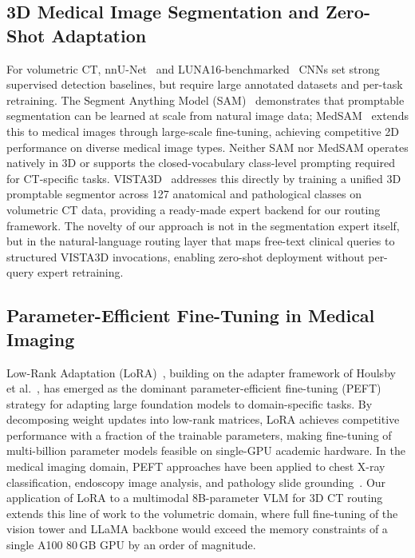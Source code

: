 \documentclass[lineno,referee,pdflatex,sn-mathphys-num]{sn-jnl}
\begin{document}
\subsection{3D Medical Image Segmentation and Zero-Shot Adaptation}

For volumetric CT, nnU-Net~\cite{nnunet2021} and
LUNA16-benchmarked~\cite{luna16} CNNs set strong supervised detection
baselines, but require large annotated datasets and per-task retraining.
The Segment Anything Model (SAM)~\cite{kirillov2023sam} demonstrates that
promptable segmentation can be learned at scale from natural image data;
MedSAM~\cite{ma2024medsam} extends this to medical images through
large-scale fine-tuning, achieving competitive 2D performance on diverse
medical image types. Neither SAM nor MedSAM operates natively in 3D or
supports the closed-vocabulary class-level prompting required for
CT-specific tasks. VISTA3D~\cite{vista3d2024} addresses this directly by
training a unified 3D promptable segmentor across 127 anatomical and
pathological classes on volumetric CT data, providing a ready-made expert
backend for our routing framework. The novelty of our approach is not in
the segmentation expert itself, but in the natural-language routing layer
that maps free-text clinical queries to structured VISTA3D invocations,
enabling zero-shot deployment without per-query expert retraining.

\subsection{Parameter-Efficient Fine-Tuning in Medical Imaging}

Low-Rank Adaptation (LoRA)~\cite{lora2022}, building on the adapter
framework of Houlsby et al.~\cite{houlsby2019}, has emerged as the
dominant parameter-efficient fine-tuning (PEFT) strategy for adapting
large foundation models to domain-specific tasks. By decomposing weight
updates into low-rank matrices, LoRA achieves competitive performance
with a fraction of the trainable parameters, making fine-tuning of
multi-billion parameter models feasible on single-GPU academic hardware.
In the medical imaging domain, PEFT approaches have been applied to chest
X-ray classification, endoscopy image analysis, and pathology slide
grounding~\cite{litjens2017}. Our application of LoRA to a multimodal
8B-parameter VLM for 3D CT routing extends this line of work to the
volumetric domain, where full fine-tuning of the vision tower and LLaMA
backbone would exceed the memory constraints of a single A100 80\,GB GPU
by an order of magnitude.
\end{document}
